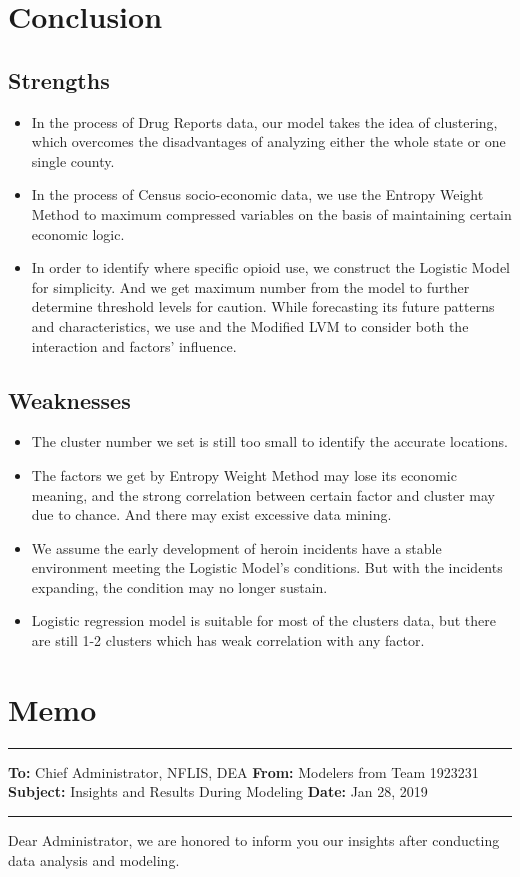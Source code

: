 \documentclass[12pt]{article}
\begin{document}
\section{Conclusion}
\subsection{Strengths}
\begin{itemize}
	\item In the process of Drug Reports data, our model takes the idea of clustering, which overcomes the disadvantages of analyzing either the whole state or one single county. 
	\item In the process of Census socio-economic data, we use the Entropy Weight Method to maximum compressed variables on the basis of maintaining certain economic logic.
	\item In order to identify where specific opioid use, we construct the Logistic Model for simplicity. And we get maximum number from the model to further determine threshold levels for caution. While forecasting its future patterns and characteristics, we use and the Modified LVM to consider both the interaction and factors’ influence.

\end{itemize}

\subsection{Weaknesses}
\begin{itemize}
	\item The cluster number we set is still too small to identify the accurate locations.
	\item The factors we get by Entropy Weight Method may lose its economic meaning, and the strong correlation between certain factor and cluster may due to chance. And there may exist excessive data mining.
	\item We assume the early development of heroin incidents have a stable environment meeting the Logistic Model's conditions. But with the incidents expanding, the condition may no longer sustain.
	\item Logistic regression model is suitable for most of the clusters data, but there are still 1-2 clusters which has weak correlation with any factor.
 \end{itemize}

 \clearpage
 \section*{Memo}
 \noindent\rule{\textwidth}{0.8pt}
 \textbf{To:} Chief Administrator, NFLIS, DEA \newline
 \textbf{From:} Modelers from Team 1923231\newline
 \textbf{Subject:} Insights and Results During Modeling\newline
 \textbf{Date:} Jan 28, 2019\newline
 \noindent\rule{\textwidth}{0.8pt}
 Dear Administrator, we are honored to inform you our insights after conducting data analysis and modeling.
\end{document}
